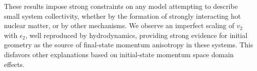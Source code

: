 These results impose strong constraints on any model attempting to describe
 small system collectivity, whether by the formation of strongly interacting hot nuclear matter, or by other mechanisms.
 We observe an imperfect scaling of $v_2$ with $\epsilon_2$, well reproduced by hydrodynamics, providing strong evidence for initial
 geometry as the source of final-state momentum anisotropy in these systems. This disfavors other explanations based
 on initial-state momentum space domain effects.